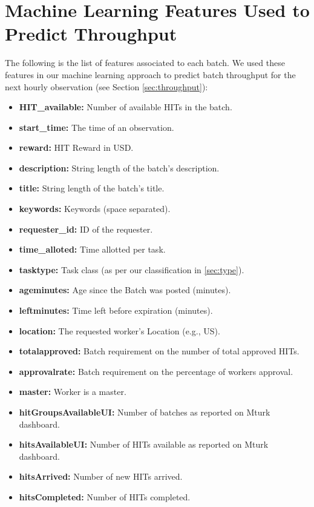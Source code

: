 \appendix

\label{ap:feats}
\section{Machine Learning Features Used to Predict Throughput}
The following is the list of features associated to each batch. We used these features in our machine learning approach to predict batch throughput for the next hourly observation (see Section \ref{sec:throughput}):
\begin{itemize}[noitemsep]
\item \textbf{HIT\_available:} Number of available HITs in the batch.
\item \textbf{start\_time:} The time of an observation.
\item \textbf{reward:} HIT Reward in USD.
\item \textbf{description:} String length of the batch's description.
\item \textbf{title:} String length of the batch's title.
\item \textbf{keywords:} Keywords (space separated).
\item \textbf{requester\_id:} ID of the requester.
\item \textbf{time\_alloted:} Time allotted per task.
\item \textbf{tasktype:} Task class (as per our classification in \ref{sec:type}).
\item \textbf{ageminutes:} Age since the Batch was posted (minutes).
\item \textbf{leftminutes:} Time left before expiration (minutes).
\item \textbf{location:} The requested worker's Location (e.g., US).
\item \textbf{totalapproved:} Batch requirement on the number of total approved HITs.
\item \textbf{approvalrate:} Batch requirement on the percentage of workers approval.
\item \textbf{master:} Worker is a master.
\item \textbf{hitGroupsAvailableUI:} Number of batches as reported on Mturk dashboard.
\item \textbf{hitsAvailableUI:} Number of HITs available as reported on Mturk dashboard.
\item \textbf{hitsArrived:} Number of new HITs arrived.
\item \textbf{hitsCompleted:} Number of HITs completed.

\end{itemize}
